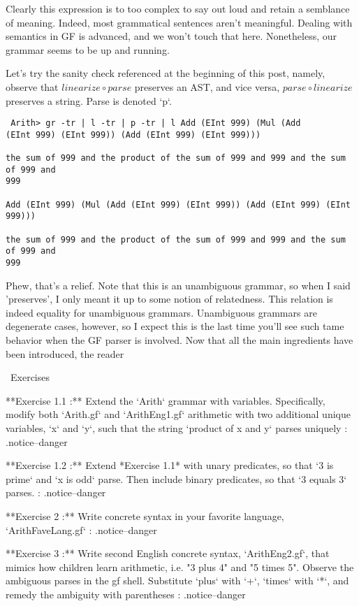\documentclass[11pt, a4paper]{article}
\begin{document}
Clearly this expression is to too complex to say out loud and retain a semblance
of meaning. Indeed, most grammatical sentences aren't meaningful. Dealing with
semantics in GF is advanced, and we won't touch that here. Nonetheless, our
grammar seems to be up and running.

Let's try the sanity check referenced at the beginning of this post, namely,
observe that $linearize \circ parse$ preserves an AST, and vice versa, $parse
\circ linearize$ preserves a string. Parse is denoted `p`.

\begin{verbatim} Arith> gr -tr | l -tr | p -tr | l Add (EInt 999) (Mul (Add
(EInt 999) (EInt 999)) (Add (EInt 999) (EInt 999)))

the sum of 999 and the product of the sum of 999 and 999 and the sum of 999 and
999

Add (EInt 999) (Mul (Add (EInt 999) (EInt 999)) (Add (EInt 999) (EInt 999)))

the sum of 999 and the product of the sum of 999 and 999 and the sum of 999 and
999
\end{verbatim}

Phew, that's a relief. Note that this is an unambiguous grammar, so when I said
'preserves', I only meant it up to some notion of relatedness. This relation is
indeed equality for unambiguous grammars. Unambiguous grammars are degenerate
cases, however, so I expect this is the last time you'll see such tame behavior
when the GF parser is involved. Now that all the main ingredients have been
introduced, the reader

\ Exercises

**Exercise 1.1 :** Extend the `Arith` grammar with variables. Specifically,
modify both `Arith.gf` and `ArithEng1.gf` arithmetic with two additional unique
variables, `x` and `y`, such that the string `product of x and y` parses
uniquely {: .notice--danger}

**Exercise 1.2 :** Extend *Exercise 1.1* with unary predicates, so that `3 is
prime` and `x is odd` parse. Then include binary predicates, so that `3 equals
3` parses. {: .notice--danger}

**Exercise 2 :** Write concrete syntax in your favorite language,
`ArithFaveLang.gf` {: .notice--danger}

**Exercise 3 :** Write second English concrete syntax, `ArithEng2.gf`, that
mimics how children learn arithmetic, i.e. "3 plus 4" and "5 times 5". Observe
the ambiguous parses in the gf shell. Substitute `plus` with `+`, `times` with
`*`, and remedy the ambiguity with parentheses {: .notice--danger}
\end{document}
